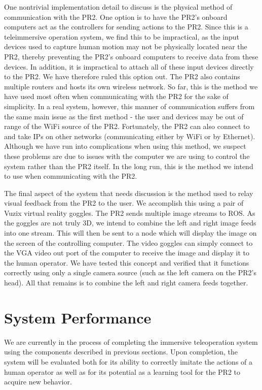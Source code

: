 \documentclass{sig-alternate}
\begin{document}
One nontrivial implementation detail to discuss is the physical method of
communication with the PR2. One option is to have the PR2's onboard computers
act as the controllers for sending actions to the PR2. Since this is a teleimmersive operation system, we find
this to be impractical, as the input devices used to capture human motion may not be physically located
near the PR2, thereby preventing the PR2's onboard computers to receive data from these devices. 
In addition, it is impractical to attach all of these input devices 
directly to the PR2. We have therefore ruled this option out. The PR2 also contains multiple routers and hosts its
own wireless network. So far, this is the method we have used most often when
communicating with the PR2 for the sake of simplicity. In a real system, however,
this manner of communication suffers from the same main issue as the first method - the user and devices
may be out of range of the WiFi source of the PR2. Fortunately,
the PR2 can also connect to and take IPs on other networks (communicating either by WiFi or by
Ethernet). Although we have run into complications when using this method, we
suspect these problems are due to issues with the computer we are using to control the
system rather than the PR2 itself.
In the long run, this is the method we intend to use when communicating with the PR2.

The final aspect of the system that needs discussion is the method used to relay visual feedback from the PR2 to the user.
We accomplish this using a
pair of  Vuzix virtual reality goggles. The PR2 sends multiple image 
streams to ROS. As the goggles are not truly 3D, we intend to combine the left 
and right image feeds into one stream. This will then be sent to a node which will display the image
on the screen of the controlling computer. The video goggles can simply connect
to the VGA video out port of the computer to
receive the image and display it to the human operator. We have tested this concept and
verified that it functions correctly using only a single camera source (such as
the left camera on the PR2's head). All that remains is to combine the left and right camera
feeds together.

\section{System Performance}
\label{sec:system_performance}
We are currently in the process of completing the immersive 
teleoperation system using the components described in previous sections. Upon
completion, the system will be evaluated both for its ability to correctly
imitate the actions of a human operator as well as for its potential 
as a learning tool for the PR2 to acquire new behavior.\\
\end{document}
